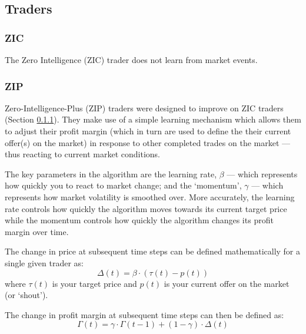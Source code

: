 \documentclass{acm_proc_article-sp}
\begin{document}
\subsection{Traders} \label{sec:traders}
\subsubsection{ZIC} \label{sec:traders_ZIC}
The Zero Intelligence (ZIC) trader does not learn from market events\cite{ZIC_paper}.\\

\subsubsection{ZIP} \label{sec:traders_ZIP}
Zero-Intelligence-Plus (ZIP) traders were designed to improve on ZIC traders (Section \ref{sec:traders_ZIC}). They make use of a simple learning mechanism which allows them to adjust their profit margin (which in turn are used to define the their current offer(s) on the market) in response to other completed trades on the market --- thus reacting to current market conditions.

The key parameters in the algorithm are the learning rate, $\beta$ --- which represents how quickly you to react to market change; and the `momentum', $\gamma$ --- which represents how market volatility is smoothed over. More accurately, the learning rate controls how quickly the algorithm moves towards its current target price while the momentum controls how quickly the algorithm changes its profit margin over time.

The change in price at subsequent time steps can be defined mathematically for a single given trader as:
\begin{equation}
\Delta(t) = \beta \cdot ( \tau(t) - p(t))
\end{equation}
where $\tau(t)$ is your target price and $p(t)$ is your current offer on the market (or `shout').

The change in profit margin at subsequent time steps can then be defined as:
\begin{equation}
\Gamma(t) = \gamma \cdot \Gamma(t-1) + (1 - \gamma) \cdot \Delta(t)
\end{equation}
\end{document}
